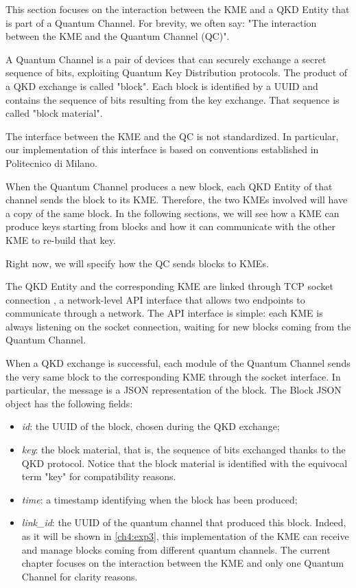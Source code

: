 This section focuses on the interaction between the KME and a QKD Entity that is part of a Quantum Channel. For brevity, we often say: "The interaction between the KME and the Quantum Channel (QC)".

A Quantum Channel is a pair of devices that can securely exchange a secret sequence of bits, exploiting Quantum Key Distribution protocols. The product of a QKD exchange is called "block". Each block is identified by a UUID and contains the sequence of bits resulting from the key exchange. That sequence is called "block material".

The interface between the KME and the QC is not standardized. In particular, our implementation of this interface is based on conventions established in Politecnico di Milano.

When the Quantum Channel produces a new block, each QKD Entity of that channel sends the block to its KME. Therefore, the two KMEs involved will have a copy of the same block. In the following sections, we will see how a KME can produce keys starting from blocks and how it can communicate with the other KME to re-build that key.

Right now, we will specify how the QC sends blocks to KMEs.

The QKD Entity and the corresponding KME are linked through TCP socket connection \cite{socket}, a network-level API interface that allows two endpoints to communicate through a network. The API interface is simple: each KME is always listening on the socket connection, waiting for new blocks coming from the Quantum Channel.

When a QKD exchange is successful, each module of the Quantum Channel sends the very same block to the corresponding KME through the socket interface. In particular, the message is a JSON representation of the block. The Block JSON object has the following fields:

\begin{itemize}
    \item \textit{id}: the UUID of the block, chosen during the QKD exchange;
    \item \textit{key}: the block material, that is, the sequence of bits exchanged thanks to the QKD protocol. Notice that the block material is identified with the equivocal term "key" for compatibility reasons.
    \item \textit{time}: a timestamp identifying when the block has been produced;
    \item \textit{link\_id}: the UUID of the quantum channel that produced this block. Indeed, as it will be shown in \ref{ch4:exp3}, this implementation of the KME can receive and manage blocks coming from different quantum channels. The current chapter focuses on the interaction between the KME and only one Quantum Channel for clarity reasons.
\end{itemize}

